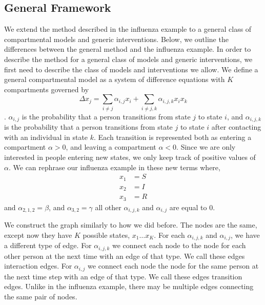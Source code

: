 \documentclass[openacc]{rsproca_new}%
\begin{document}
\subsection{General Framework}\label{subsection:general}

We extend the method described in the influenza example to a general class of compartmental models and generic interventions.
Below, we outline the differences between the general method and the influenza example.
In order to describe the method for a general class of models and generic interventions, we first need to describe the class of models and interventions we allow.
We define a general compartmental model as a system of difference equations with $K$ compartments governed by \[\Delta x_{j} = \sum_{i \neq j} \alpha_{i,j}x_i + \sum_{i \neq j, k} \alpha_{i,j,k} x_ix_k\].
$\alpha_{i,j}$ is the probability that a person transitions from state $j$ to state $i$, and $\alpha_{i,j,k}$ is the probability that a person transitions from state $j$ to state $i$ after contacting with an individual in state $k$.
Each transition is represented both as entering a compartment $\alpha > 0$, and leaving a compartment $\alpha < 0$.
Since we are only interested in people entering new states, we only keep track of positive values of $\alpha$.
We can rephrase our influenza example in these new terms where,
\begin{align*}
    x_1 &= S \\
    x_2 &= I \\
    x_3 &= R
\end{align*}
and $\alpha_{2,1,2} = \beta $, and $\alpha_{3,2} = \gamma$ all other $\alpha_{i,j,k}$ and $\alpha_{i,j}$ are equal to $0$.

We construct the graph similarly to how we did before.
The nodes are the same, except now they have $K$ possible states, $x_1 \dots x_K$.
For each $\alpha_{i,j,k}$ and $\alpha_{i,j}$, we have a different type of edge.
For $\alpha_{i,j,k}$ we connect each node to the node for each other person at the next time with an edge of that type.
We call these edges interaction edges.
For $\alpha_{i,j}$ we connect each node the node for the same person at the next time step with an edge of that type.
We call these edges transition edges.
Unlike in the influenza example, there may be multiple edges connecting the same pair of nodes.
\end{document}
